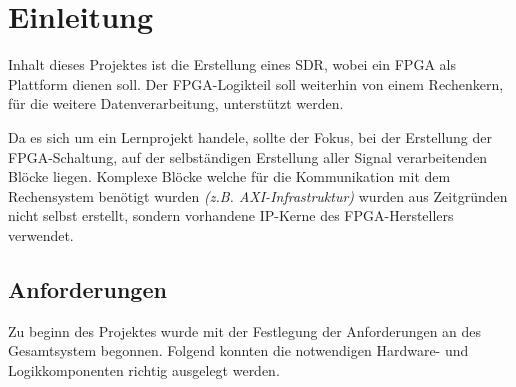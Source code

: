 \chapter{Einleitung}
Inhalt dieses Projektes ist die Erstellung eines \acs{SDR}, wobei ein \acs{FPGA} als Plattform dienen soll. 
Der \acs{FPGA}-Logikteil soll weiterhin von einem Rechenkern, für die weitere Datenverarbeitung, unterstützt werden.

Da es sich um ein Lernprojekt handele, sollte der Fokus, bei der Erstellung der \acs{FPGA}-Schaltung, auf der selbständigen Erstellung aller Signal verarbeitenden Blöcke liegen.
Komplexe Blöcke welche für die Kommunikation mit dem Rechensystem benötigt wurden \textit{(z.B. AXI-Infrastruktur)} wurden aus Zeitgründen nicht selbst erstellt, sondern vorhandene
IP-Kerne des \acs{FPGA}-Herstellers verwendet.

\section{Anforderungen}
Zu beginn des Projektes wurde mit der Festlegung der Anforderungen an des Gesamtsystem begonnen. Folgend konnten die notwendigen Hardware- und Logikkomponenten richtig ausgelegt werden.

